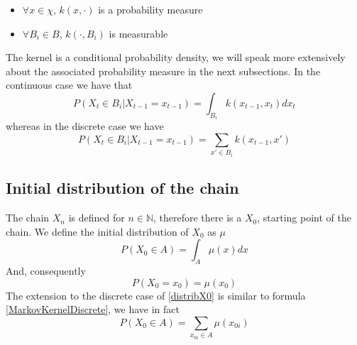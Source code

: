 \documentclass[12pt,mythesisstyle]{report}
\begin{document}
\begin{itemize}\label{MArkovKernel}
	\item $\forall x \in \chi$, $k(x,\cdot)$ is a probability measure
	\item $\forall B_i \in B$, $k(\cdot, B_i)$ is measurable
\end{itemize}
The kernel is a conditional probability density, we will speak more extensively about the associated probability measure in the next subsections. In the continuous case we have that
\begin{equation}\label{MarkovKernelContinuous}
P(X_t \in B_i|X_{t-1}=x_{t-1})=\int_{B_i}k(x_{t-1},x_t)dx_t
\end{equation}
whereas in the discrete case we have
\begin{equation}\label{MarkovKernelDiscrete}
P(X_t \in B_i|X_{t-1}=x_{t-1}) = \sum_{x'\in B_i} k(x_{t-1},x')
\end{equation}

\subsection{Initial distribution of the chain}\label{subsectionX0distrib}
The chain $X_n$ is defined for $n \in \mathbb{N}$, therefore there is a $X_0$, starting point of the chain. We define the initial distribution of $X_0$ as $\mu$
\begin{equation}\label{distribX0}
P(X_0 \in A)=\int_A \mu(x) dx
\end{equation}
And, consequently
\begin{equation}
P(X_0=x_0)=\mu(x_0)
\end{equation}
The extension to the discrete case of \eqref{distribX0} is similar to formula \eqref{MarkovKernelDiscrete}, we have in fact
\begin{equation}\label{distribX0discrete}
P(X_0 \in A)=\sum_{x_{0i} \in A } \mu(x_{0i}) 
\end{equation}
\end{document}
